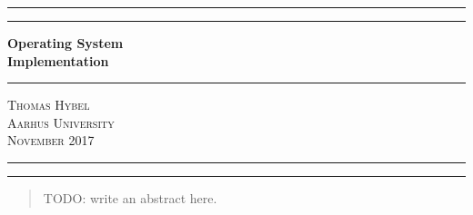 \documentclass{report}
\begin{document}


\begin{titlepage} %

\centering %

\rule{\textwidth}{1pt} %
\vspace{2pt}\vspace{-\baselineskip} %
\rule{\textwidth}{0.4pt} %
\vspace{0.1\textheight} %

{\Huge \bfseries
Operating System \\ Implementation
}

\vspace{0.010\textheight} %
\rule{0.3\textwidth}{0.4pt} %
\vspace{0.01\textheight} %

{\Large \textsc{Thomas Hybel}} \\[0.5\baselineskip]
{\Large \textsc{Aarhus University}} \\[0.5\baselineskip]
{\Large \textsc{November 2017}} 

\vfill %




\rule{\textwidth}{0.4pt} %
\vspace{2pt}\vspace{-\baselineskip} %
\rule{\textwidth}{1pt} %

\end{titlepage}




\begin{abstract} 
\noindent 
TODO: write an abstract here.
\end{abstract}


\tableofcontents

\end{document}
